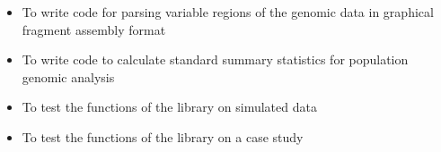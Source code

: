 \begin{itemize}
    \item To write code for parsing variable regions of the genomic data in graphical fragment assembly format 
    \item To write code to calculate standard summary statistics for population genomic analysis 
    \item To test the functions of the library on simulated data
    \item To test the functions of the library on a case study
\end{itemize}










